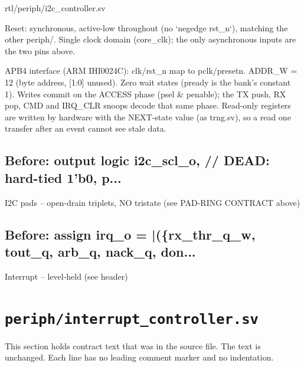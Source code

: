 \begin{relocated}{rtl/periph/i2c_controller.sv}
\begin{textblock}
Reset: synchronous, active-low throughout (no `negedge rst_n`), matching the other periph/.
Single clock domain (core_clk); the only asynchronous inputs are the two pins above.

APB4 interface (ARM IHI0024C): clk/rst_n map to pclk/presetn. ADDR_W = 12 (byte address, [1:0]
unused). Zero wait states (pready is the bank's constant 1). Writes commit on the ACCESS phase
(psel & penable); the TX push, RX pop, CMD and IRQ_CLR snoops decode that same phase. Read-only
registers are written by hardware with the NEXT-state value (as trng.sv), so a read one transfer
after an event cannot see stale data.
\end{textblock}

\subsection*{Before: output logic i2c\_scl\_o,       // DEAD: hard-tied 1'b0, p...}

\begin{textblock}
I2C pads -- open-drain triplets, NO tristate (see PAD-RING CONTRACT above)
\end{textblock}

\subsection*{Before: assign irq\_o = |(\{rx\_thr\_q\_w, tout\_q, arb\_q, nack\_q, don...}

\begin{textblock}
Interrupt -- level-held (see header)
\end{textblock}

\end{relocated}

\section{\texttt{periph/interrupt\_controller.sv}}\label{ds:mod:interrupt-controller}

This section holds contract text that was in the source file. The text is unchanged. Each line has no leading comment marker and no indentation.

